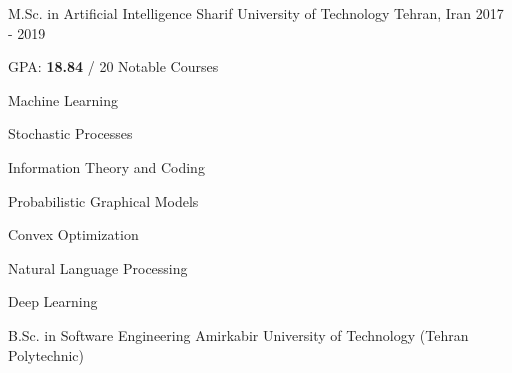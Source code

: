 \begin{cventries}
	\cventry
	{M.Sc. in Artificial Intelligence} %
	{Sharif University of Technology} %
	{Tehran, Iran} %
	{2017 - 2019} %
	{
		GPA: \textbf{18.84} / 20
		\newline
		\textcolor{awesome}{Notable Courses}
		\vspace{-.4cm}
		\begin{multicols}{3}
			\begin{cvitems}
\iffalse                
				\item {Machine Learning\hspace{0.5cm} 19.5}
				\item {Stochastic Processes \hspace{0.5cm} 17.9}
				\item {Information Theory and Coding \hspace{0.5cm} 16.5}
				\item {Probabilistic Graphical Models \hspace{0.5cm} 19.7}
				\item {Convex Optimization \hspace{0.5cm} 19.2}
				\item {Natural Language Processing \hspace{0.5cm} 19.5}
				\item {Deep Learning \hspace{0.5cm} 19.3}
\fi
				\item {Machine Learning}
                \item {Stochastic Processes}
                \item {Information Theory and Coding}
                \item {Probabilistic Graphical Models}
                \item {Convex Optimization}
                \item {Natural Language Processing}
                \item {Deep Learning}
			\end{cvitems}
		\end{multicols}
	}
    \vspace{-.5cm}
	\cventry
	{B.Sc. in Software Engineering} %
	{Amirkabir University of Technology {\scriptsize (Tehran Polytechnic)}} %

\end{cventries}
